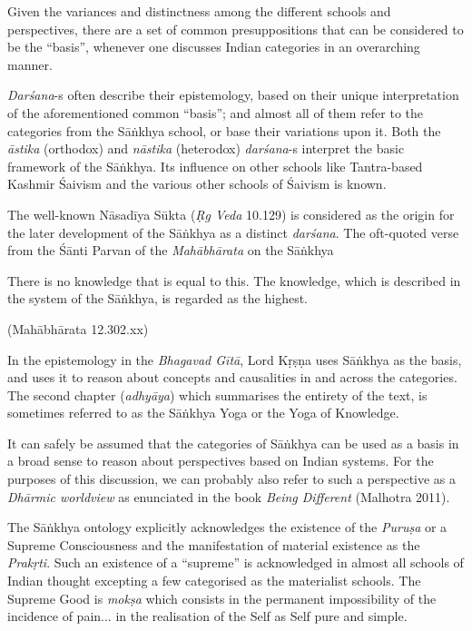 Given the variances and distinctness among the different schools and perspectives, there are a set of common presuppositions that can be considered to be the ``basis'', whenever one discusses Indian categories in an overarching manner.

{\sl Darśana}-s often describe their epistemology, based on their unique interpretation of the aforementioned common ``basis''; and almost all of them refer to the categories from the Sāṅkhya school, or base their variations upon it. Both the {\sl āstika} (orthodox) and {\sl nāstika} (heterodox) {\sl darśana}-s interpret the basic framework of the Sāṅkhya. Its influence on other schools like Tantra-based Kashmir Śaivism and the various other schools of Śaivism is known.

The well-known Nāsadīya Sūkta ({\sl Ṛg Veda} 10.129) is considered as the origin for the later development of the Sāṅkhya as a distinct {\sl darśana}. The oft-quoted verse from the Śānti Parvan of the {\sl Mahābhārata} on the Sāṅkhya
\begin{myquote}
There is no knowledge that is equal to this. The knowledge, which is described in the system of the Sāṅkhya, is regarded as the highest.

\hfill (Mahābhārata 12.302.xx)
\end{myquote}

In the epistemology in the {\sl Bhagavad Gītā}, Lord Kṛṣṇa uses Sāṅkhya as the basis, and uses it to reason about concepts and causalities in and across the categories. The second chapter ({\sl adhyāya}) which summarises the entirety of the text, is sometimes referred to as the Sāṅkhya Yoga or the Yoga of Knowledge. 

It can safely be assumed that the categories of Sāṅkhya can be used as a basis in a broad sense to reason about perspectives based on Indian systems. For the purposes of this discussion, we can probably also refer to such a perspective as a {\sl Dhārmic worldview} as enunciated in the book {\sl Being Different} (Malhotra 2011).

The Sāṅkhya ontology explicitly acknowledges the existence of the {\sl Puruṣa} or a Supreme Consciousness and the manifestation of material existence as the {\sl Prakṛti}. Such an existence of a ``supreme'' is acknowledged in almost all schools of Indian thought excepting a few categorised as the materialist schools. The Supreme Good is {{\sl mokṣa}\relax} which consists in the permanent impossibility of the incidence of pain... in the realisation of the Self as Self pure and simple.

